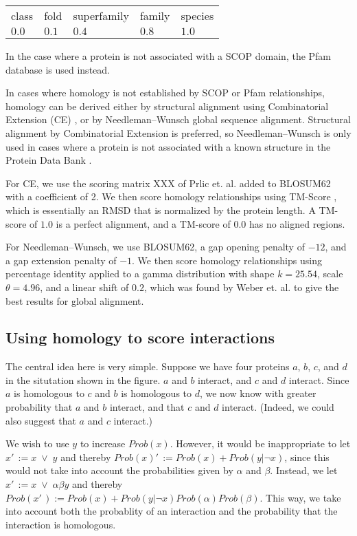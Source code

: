 \documentclass[12pt,twoside]{article}
\def\NI{\noindent}
\def\RS{
	\setlength{\itemsep}{0em}
	\setlength{\parskip}{0.4em}
	\setlength{\parsep}{0em}
}
\begin{document}
\begin{tabular}{lllll}
class & fold & superfamily & family & species \\
$0.0$ & $0.1$ & $0.4$ & $0.8$ & $1.0$ \\
\end{tabular}

\NI In the case where a protein is not associated with a SCOP domain, the Pfam database is used instead. \RS
\NI In cases where homology is not established by SCOP \cite{scop} or Pfam relationships, homology can be derived either by structural alignment using Combinatorial Extension (CE) \cite{ce}, or by Needleman--Wunsch \cite{needleman} global sequence alignment. Structural alignment by Combinatorial Extension is preferred, so Needleman--Wunsch is only used in cases where a protein is not associated with a known structure in the Protein Data Bank \cite{pdb}.

\NI For CE, we use the scoring matrix XXX of Prlic et. al. \cite{prlic} added to BLOSUM62 \cite{blosum} with a coefficient of 2. We then score homology relationships using TM-Score \cite{zhang}, which is essentially an RMSD that is normalized by the protein length. A TM-score of $1.0$ is a perfect alignment, and a TM-score of $0.0$ has no aligned regions.

\NI For Needleman--Wunsch, we use BLOSUM62, a gap opening penalty of $-12$, and a gap extension penalty of $-1$. We then score homology relationships using percentage identity applied to a gamma distribution with shape $k=25.54$, scale $\theta=4.96$, and a linear shift of $0.2$, which was found by Weber et. al. \cite{webber} to give the best results for global alignment.

\subsection{Using homology to score interactions}

\NI The central idea here is very simple. Suppose we have four proteins $a$, $b$, $c$, and $d$ in the situtation shown in the figure. $a$ and $b$ interact, and $c$ and $d$ interact. Since $a$ is homologous to $c$ and $b$ is homologous to $d$, we now know with greater probability that $a$ and $b$ interact, and that $c$ and $d$ interact. (Indeed, we could also suggest that $a$ and $c$ interact.)

\NI We wish to use $y$ to increase $Prob(x)$. However, it would be inappropriate to let $x'\,\! := x \; \vee \; y$ and thereby $Prob(x)'\,\! := Prob(x) + Prob(y|\neg x)$, since this would not take into account the probabilities given by $\alpha$ and $\beta$. Instead, we let $x'\,\! := x \; \vee \; \alpha \beta y$ and thereby $Prob(x'\,\!) := Prob(x) + Prob(y | \neg x) Prob(\alpha) Prob(\beta)$. This way, we take into account both the probablity of an interaction and the probability that the interaction is homologous.
\end{document}
